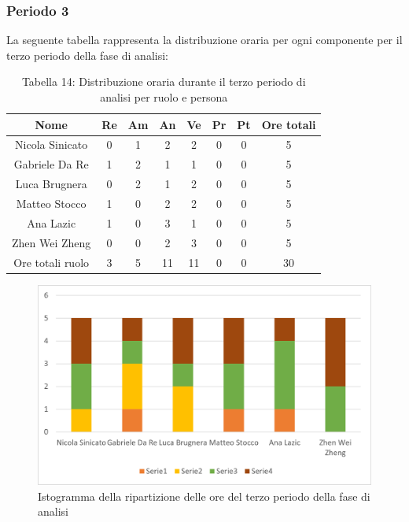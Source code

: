 \subsubsection{Periodo 3}
%
La seguente tabella rappresenta la distribuzione oraria per ogni componente per il terzo periodo della fase di analisi:
\begin{table}[h]
	\setlength\extrarowheight{5pt}
	\centering
	\begin{tabularx}{\textwidth}{|ccccccc|c|}
		\hline
		\rowcolor{white}
		\textbf{Nome} & \textbf{Re} & \textbf{Am} & \textbf{An} & \textbf{Ve} & \textbf{Pr}& \textbf{Pt} & \textbf{Ore totali} \\
		\hline
		Nicola Sinicato &0&1&2&2&0&0&5 \\
		Gabriele Da Re &1&2&1&1&0&0&5 \\
		Luca Brugnera &0&2&1&2&0&0&5 \\
		Matteo Stocco &1&0&2&2&0&0&5 \\
		Ana Lazic &1&0&3&1&0&0&5 \\
		Zhen Wei Zheng &0&0&2&3&0&0&5 \\
		\hline
		Ore totali ruolo &3&5&11&11&0&0&30 \\
		\hline
	\end{tabularx}
	\vspace{10pt}
	\caption{Tabella 14: Distribuzione oraria durante il terzo periodo di analisi per ruolo e persona}
\end{table}
\begin{figure}[H]
    \centering
    \includegraphics[scale=0.6]{img/grafi preventivo/istogrammi/analisi/periodo3.png}
    \caption{Istogramma della ripartizione delle ore del terzo periodo della fase di analisi}
\end{figure}
